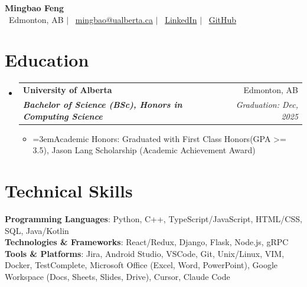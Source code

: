 \documentclass[letterpaper,11pt]{article}
\makeatletter
\newcommand{\resumeItem}[1]{
  \item\small{
    \justifying{#1}
  }
}
\newcommand{\resumeSubheading}[4]{
  \vspace{-2pt}\item
    \begin{tabular*}{\textwidth}[t]{l@{\extracolsep{\fill}}r}
      \textbf{#1} & #2 \\
      \textit{\small\color{lightgray}#3} & \textit{\small\color{lightgray}#4} \\
    \end{tabular*}
}
\newcommand{\resumeSubHeadingListStart}{\begin{itemize}[leftmargin=0in, label={}]\setlength{\itemsep}{0pt}\setlength{\parsep}{0pt}\setlength{\parskip}{0pt}}
\newcommand{\resumeSubHeadingListEnd}{\end{itemize}}
\newcommand{\resumeItemListStart}{\begin{itemize}\setlength{\itemsep}{2pt}\setlength{\parsep}{2pt}\setlength{\parskip}{2pt}}
\newcommand{\resumeItemListEnd}{\end{itemize}}
\newcommand{\justifying}[1]{\raggedright\hyphenpenalty=1000\tolerance=1000\emergencystretch=3em#1}
\makeatother
\begin{document}
\begin{center}
    {\Huge \bfseries \color{darkgray} Mingbao Feng} \\ \vspace{8pt}
    \color{darkgray}
    \faMapMarker* \, Edmonton, AB \quad $|$ \quad
    \faEnvelope \, \href{mailto:mingbao@ualberta.ca}{mingbao@ualberta.ca} \quad $|$ \quad
    \faLinkedin \, \href{http://www.linkedin.com/in/mingbo-feng-198556257}{LinkedIn} \quad $|$ \quad
    \faGithubSquare \, \href{https://github.com/Mingbaof}{GitHub}
\end{center}
\vspace{-10pt}

\section{Education}
  \resumeSubHeadingListStart
    \resumeSubheading
      {University of Alberta}{Edmonton, AB}
      {\textbf{Bachelor of Science (BSc), Honors in Computing Science}}{Graduation: Dec, 2025}
      \resumeItemListStart
            \resumeItem{Academic Honors: Graduated with First Class Honors(GPA >= 3.5), Jason Lang Scholarship (Academic Achievement Award)}

      \resumeItemListEnd
  \resumeSubHeadingListEnd


\vspace{-1.5em}
\section{Technical Skills}
 \begin{itemize}[leftmargin=0in, label={}]
    \small{\item{
     \textbf{Programming Languages}{: Python, C++, TypeScript/JavaScript, HTML/CSS, SQL, Java/Kotlin} \\
     \textbf{Technologies \& Frameworks}{: React/Redux, Django, Flask, Node.js, gRPC} \\
     \textbf{Tools \& Platforms}{: Jira, Android Studio, VSCode, Git, Unix/Linux, VIM, Docker, TestComplete, Microsoft Office (Excel, Word, PowerPoint), Google Workspace (Docs, Sheets, Slides, Drive), Cursor, Claude Code} \\
    }}
 \end{itemize}
\vspace{-1.5em}
\end{document}
